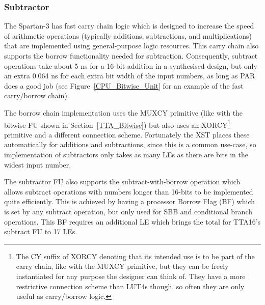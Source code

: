 \subsubsection{Subtractor}

% 

The Spartan-3 has fast carry chain logic which is designed to increase the
speed of arithmetic operations (typically additions, subtractions, and
multiplications) that are implemented using general-purpose logic resources.
This carry chain also supports the borrow functionality needed for subtraction.
Consequently, subtract operations take about 5 ns for a 16-bit addition in a
synthesised design, but only an extra 0.064 ns for each extra bit width of the
input numbers, as long as PAR does a good job (see
Figure~\ref{CPU_Bitwise_Unit} for an example of the fast carry/borrow chain).

The borrow chain implementation uses the MUXCY primitive (like with the
bitwise FU shown in Section~\ref{TTA_Bitwise}) but also uses an
XORCY\footnote{The CY suffix of XORCY denoting that its intended use is to be
part of the carry chain, like with the MUXCY primitive, but they can be freely
instantiated for any purpose the designer can think of. They have a more
restrictive connection scheme than LUT4s though, so often they are only useful
as carry/borrow logic.} primitive and a different connection scheme.
Fortunately the XST places these automatically for additions and subtractions,
since this is a common use-case, so implementation of subtractors only takes as
many LEs as there are bits in the widest input number.

The subtractor FU also supports the subtract-with-borrow operation which
allows subtract operations with numbers longer than 16-bits to be implemented
quite efficiently. This is achieved by having a processor Borrow Flag (BF)
which is set by any subtract operation, but only used for SBB and conditional
branch operations. This BF requires an additional LE which brings the total for
TTA16's subtract FU to 17 LEs.

